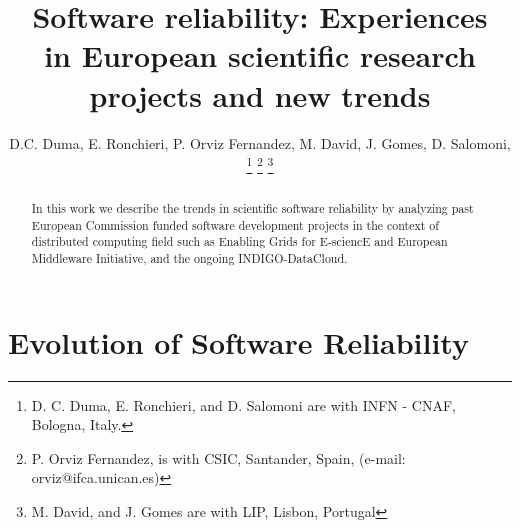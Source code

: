 \documentclass[journal]{IEEEtran}
\begin{document}
\title{Software reliability: Experiences\\
in European scientific research\\
projects and new trends}
%
%

\author{D.C. Duma, %
        E. Ronchieri, %
        P. Orviz Fernandez, %
        M. David, %
        J. Gomes, %
        D. Salomoni, %
\thanks{D. C. Duma, E. Ronchieri, and D. Salomoni are with INFN - CNAF, Bologna, Italy.}%
\thanks{P. Orviz Fernandez, is with CSIC, Santander, Spain, (e-mail: orviz@ifca.unican.es)}%
\thanks{M. David, and J. Gomes are with LIP, Lisbon, Portugal}%
}

\maketitle
\pagestyle{empty}
\thispagestyle{empty}

\begin{abstract}
In this work we describe the trends in scientific software reliability by analyzing past European Commission funded software development projects in the context of distributed computing field such as Enabling Grids for E-sciencE and European Middleware Initiative, and the ongoing INDIGO-DataCloud.
\end{abstract}



\section{Evolution of Software Reliability}
%
%
%
%
\end{document}
